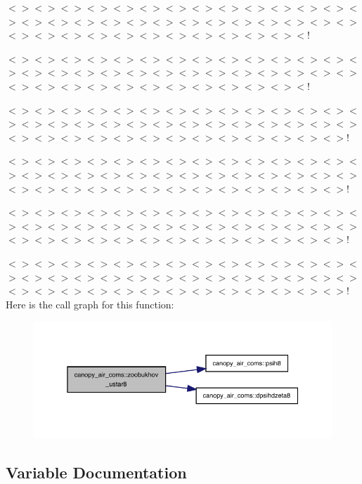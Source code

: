 $<$$>$$<$$>$$<$$>$$<$$>$$<$$>$$<$$>$$<$$>$$<$$>$$<$$>$$<$$>$$<$$>$$<$$>$$<$$>$$<$$>$$<$$>$$<$$>$$<$$>$$<$$>$$<$$>$$<$$>$$<$$>$$<$$>$$<$$>$$<$$>$$<$$>$$<$$>$$<$$>$$<$$>$$<$$>$$<$$>$$<$$>$$<$$>$$<$$>$$<$$>$$<$$>$$<$$>$$<$$>$$<$$>$$<$!

$<$$>$$<$$>$$<$$>$$<$$>$$<$$>$$<$$>$$<$$>$$<$$>$$<$$>$$<$$>$$<$$>$$<$$>$$<$$>$$<$$>$$<$$>$$<$$>$$<$$>$$<$$>$$<$$>$$<$$>$$<$$>$$<$$>$$<$$>$$<$$>$$<$$>$$<$$>$$<$$>$$<$$>$$<$$>$$<$$>$$<$$>$$<$$>$$<$$>$$<$$>$$<$$>$$<$$>$$<$$>$$<$$>$$<$!

$<$$>$$<$$>$$<$$>$$<$$>$$<$$>$$<$$>$$<$$>$$<$$>$$<$$>$$<$$>$$<$$>$$<$$>$$<$$>$$<$$>$$<$$>$$<$$>$$<$$>$$<$$>$$<$$>$$<$$>$$<$$>$$<$$>$$<$$>$$<$$>$$<$$>$$<$$>$$<$$>$$<$$>$$<$$>$$<$$>$$<$$>$$<$$>$$<$$>$$<$$>$$<$$>$$<$$>$$<$$>$$<$$>$$<$$>$$<$$>$!

$<$$>$$<$$>$$<$$>$$<$$>$$<$$>$$<$$>$$<$$>$$<$$>$$<$$>$$<$$>$$<$$>$$<$$>$$<$$>$$<$$>$$<$$>$$<$$>$$<$$>$$<$$>$$<$$>$$<$$>$$<$$>$$<$$>$$<$$>$$<$$>$$<$$>$$<$$>$$<$$>$$<$$>$$<$$>$$<$$>$$<$$>$$<$$>$$<$$>$$<$$>$$<$$>$$<$$>$$<$$>$$<$$>$$<$$>$$<$$>$!

$<$$>$$<$$>$$<$$>$$<$$>$$<$$>$$<$$>$$<$$>$$<$$>$$<$$>$$<$$>$$<$$>$$<$$>$$<$$>$$<$$>$$<$$>$$<$$>$$<$$>$$<$$>$$<$$>$$<$$>$$<$$>$$<$$>$$<$$>$$<$$>$$<$$>$$<$$>$$<$$>$$<$$>$$<$$>$$<$$>$$<$$>$$<$$>$$<$$>$$<$$>$$<$$>$$<$$>$$<$$>$$<$$>$$<$$>$$<$$>$!

$<$$>$$<$$>$$<$$>$$<$$>$$<$$>$$<$$>$$<$$>$$<$$>$$<$$>$$<$$>$$<$$>$$<$$>$$<$$>$$<$$>$$<$$>$$<$$>$$<$$>$$<$$>$$<$$>$$<$$>$$<$$>$$<$$>$$<$$>$$<$$>$$<$$>$$<$$>$$<$$>$$<$$>$$<$$>$$<$$>$$<$$>$$<$$>$$<$$>$$<$$>$$<$$>$$<$$>$$<$$>$$<$$>$$<$$>$$<$$>$! Here is the call graph for this function\+:
\nopagebreak
\begin{figure}[H]
\begin{center}
\leavevmode
\includegraphics[width=350pt]{namespacecanopy__air__coms_a6ef582f46fded1355973730e6a2289f2_cgraph}
\end{center}
\end{figure}


\subsection{Variable Documentation}
\mbox{\label{namespacecanopy__air__coms_a8943107817bd72a2ecf2c8ac35516efc}} 
